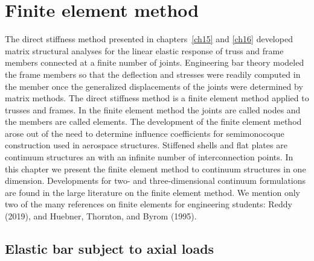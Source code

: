 \documentclass{AeroStructure-ERJohnson}
\begin{document}
\mainmatter

\setcounter{chapter}{16}
\setcounter{page}{445}

\chapter{Finite element method}\label{ch17}

The direct stiffness method presented in chapters~\ref{ch15} and \ref{ch16} developed matrix structural analyses for the linear elastic response of truss and frame members connected at a finite number of joints. Engineering bar theory modeled the frame members so that the deflection and stresses were readily computed in the member once the generalized displacements of the joints were determined by matrix methods. The direct stiffness method is a finite element method applied to trusses and frames. In the finite element method the joints are called nodes and the members are called elements. The development of the finite element method arose out of the need to determine influence coefficients for semimonocoque construction used in aerospace structures. Stiffened shells and flat plates are continuum structures an with an infinite number of interconnection points. In this chapter we present the finite element method to continuum structures in one dimension. Developments for two- and three-dimensional continuum formulations are found in the large literature on the finite element method. We mention only two of the many references on finite elements for engineering students: Reddy (2019), and Huebner, Thornton, and Byrom (1995).

{\def\thefigure{17.1}
}


\section{Elastic bar subject to axial loads}\label{sec17.1}
\end{document}
